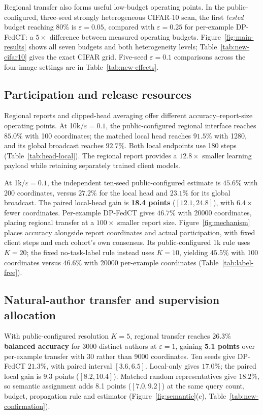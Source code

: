 Regional transfer also forms useful low-budget operating points. In the
public-configured, three-seed strongly heterogeneous CIFAR-10 scan, the first
\emph{tested} budget reaching $80\%$ is $\varepsilon=0.05$, compared with
$\varepsilon=0.25$ for per-example DP-FedCT: a $5\times$ difference between
measured operating budgets. Figure~\ref{fig:main-results} shows all seven
budgets and both heterogeneity levels; Table~\ref{tab:new-cifar10} gives the
exact CIFAR grid. Five-seed $\varepsilon=0.1$ comparisons across the four
image settings are in Table~\ref{tab:new-effects}.



\subsection{Participation and release resources}
\label{sec:scale}

Regional reports and clipped-head averaging offer different
accuracy--report-size operating points. At 10k/$\varepsilon=0.1$, the
public-configured regional interface reaches $85.0\%$ with 100 coordinates;
the matched local head reaches $91.5\%$ with 1280, and its global broadcast
reaches $92.7\%$. Both local endpoints use 180 steps
(Table~\ref{tab:head-local}). The regional report provides a
$12.8\times$ smaller learning payload while retaining separately trained
client models.

At 1k/$\varepsilon=0.1$, the independent ten-seed public-configured estimate
is $45.6\%$ with 200 coordinates, versus $27.2\%$ for the local head and
$23.1\%$ for its global broadcast. The paired local-head gain is
\textbf{18.4 points} ($[12.1,24.8]$), with $6.4\times$ fewer coordinates.
Per-example DP-FedCT gives $46.7\%$ with 20000 coordinates, placing
regional transfer at a $100\times$ smaller report size.
Figure~\ref{fig:mechanism} places accuracy alongside report coordinates and
actual participation, with fixed client steps and each cohort's own consensus.
Its public-configured 1k rule uses $K=20$; the fixed no-task-label rule instead
uses $K=10$, yielding $45.5\%$ with 100 coordinates versus $46.6\%$ with
20000 per-example coordinates (Table~\ref{tab:label-free}).

\subsection{Natural-author transfer and supervision allocation}
\label{sec:eval:web}

With public-configured resolution $K=5$, regional transfer reaches
\textbf{$26.3\%$ balanced accuracy} for 3000 distinct authors at
$\varepsilon=1$, gaining \textbf{5.1 points} over per-example transfer with
30 rather than 9000 coordinates. Ten seeds give DP-FedCT $21.3\%$,
with paired interval $[3.6,6.5]$. Local-only gives $17.0\%$; the paired
local gain is 9.3 points ($[8.2,10.4]$). Matched random representatives give
$18.2\%$, so semantic assignment adds 8.1 points ($[7.0,9.2]$) at the same
query count, budget, propagation rule and estimator
(Figure~\ref{fig:semantic}(c), Table~\ref{tab:new-confirmation}).

